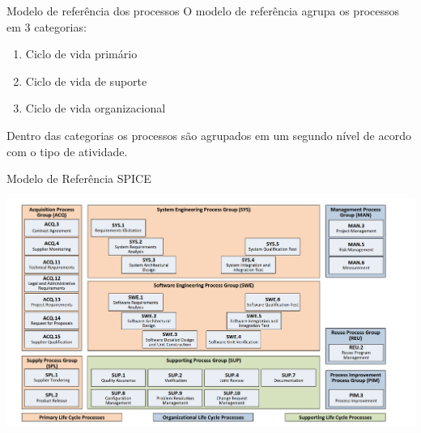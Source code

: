   


\begin{frame}{Modelo de referência dos processos}
O modelo de referência agrupa os processos em 3 categorias:

\begin{enumerate}[<+->]
\item Ciclo de vida primário
\item Ciclo de vida de suporte
\item Ciclo de vida organizacional
\end{enumerate}

\pause\bigskip
Dentro das categorias os processos são agrupados em um segundo nível
de acordo com o tipo de atividade.
\end{frame}


\begin{frame}{Modelo de Referência SPICE}
  
  \begin{center}
    \includegraphics[scale=.237]{img/spice-ref-model.png}
  \end{center}
\end{frame}

